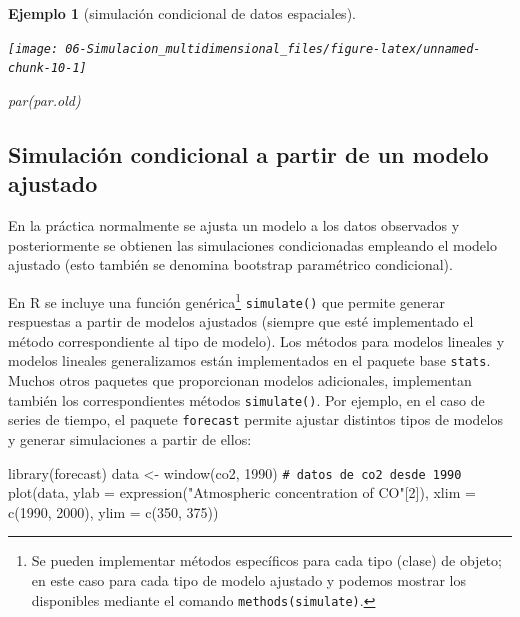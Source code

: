 \documentclass[
]{book}
\newenvironment{Shaded}{\begin{snugshade}}{\end{snugshade}}
\newcommand{\AttributeTok}[1]{\textcolor[rgb]{0.77,0.63,0.00}{#1}}
\newcommand{\CommentTok}[1]{\textcolor[rgb]{0.56,0.35,0.01}{\textit{#1}}}
\newcommand{\DecValTok}[1]{\textcolor[rgb]{0.00,0.00,0.81}{#1}}
\newcommand{\FunctionTok}[1]{\textcolor[rgb]{0.00,0.00,0.00}{#1}}
\newcommand{\NormalTok}[1]{#1}
\newcommand{\OtherTok}[1]{\textcolor[rgb]{0.56,0.35,0.01}{#1}}
\newcommand{\StringTok}[1]{\textcolor[rgb]{0.31,0.60,0.02}{#1}}
\theoremstyle{break}
\newtheorem{example}{Ejemplo}[chapter]
\theoremstyle{nonumberplain}
\renewcommand{\CommentTok}[1]{\textcolor[rgb]{0.41,0.41,0.41}{\texttt{#1}}}
\begin{document}
\begin{example}[simulación condicional de datos espaciales]
\begin{center}\texttt{[image: 06-Simulacion\_multidimensional\_files/figure-latex/unnamed-chunk-10-1]} \end{center}

\begin{Shaded}
\begin{Highlighting}[]
\FunctionTok{par}\NormalTok{(par.old)}
\end{Highlighting}
\end{Shaded}

\end{example}

\hypertarget{simulaciuxf3n-condicional-a-partir-de-un-modelo-ajustado}{%
\subsection{Simulación condicional a partir de un modelo ajustado}\label{simulaciuxf3n-condicional-a-partir-de-un-modelo-ajustado}}

En la práctica normalmente se ajusta un modelo a los datos observados y posteriormente se obtienen las simulaciones condicionadas empleando el modelo ajustado
(esto también se denomina bootstrap paramétrico condicional).

En R se incluye una función genérica\footnote{Se pueden implementar métodos específicos para cada tipo (clase) de objeto; en este caso para cada tipo de modelo ajustado y podemos mostrar los disponibles mediante el comando \texttt{methods(simulate)}.} \texttt{simulate()} que permite generar respuestas a partir de modelos ajustados (siempre que esté implementado el método correspondiente al tipo de modelo).
Los métodos para modelos lineales y modelos lineales generalizamos están implementados en el paquete base \texttt{stats}.
Muchos otros paquetes que proporcionan modelos adicionales, implementan también los correspondientes métodos \texttt{simulate()}.
Por ejemplo, en el caso de series de tiempo, el paquete \texttt{forecast} permite ajustar distintos tipos de modelos y generar simulaciones a partir de ellos:

\begin{Shaded}
\begin{Highlighting}[]
\FunctionTok{library}\NormalTok{(forecast)}
\NormalTok{data }\OtherTok{\textless{}{-}} \FunctionTok{window}\NormalTok{(co2, }\DecValTok{1990}\NormalTok{) }\CommentTok{\# datos de co2 desde 1990}
\FunctionTok{plot}\NormalTok{(data, }\AttributeTok{ylab =} \FunctionTok{expression}\NormalTok{(}\StringTok{"Atmospheric concentration of CO"}\NormalTok{[}\DecValTok{2}\NormalTok{]),}
     \AttributeTok{xlim =} \FunctionTok{c}\NormalTok{(}\DecValTok{1990}\NormalTok{, }\DecValTok{2000}\NormalTok{), }\AttributeTok{ylim =} \FunctionTok{c}\NormalTok{(}\DecValTok{350}\NormalTok{, }\DecValTok{375}\NormalTok{))}
\end{Highlighting}
\end{Shaded}
\end{document}
